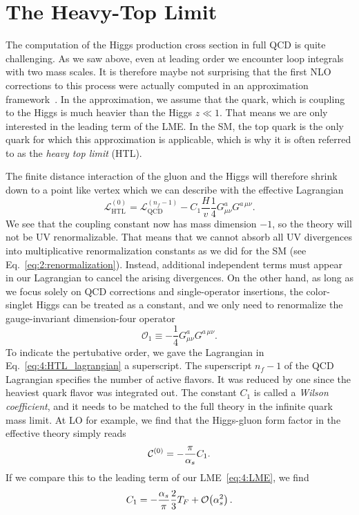 \section{The Heavy-Top Limit} \label{sec:4:HTL}
The computation of the Higgs production cross section in full \acs{QCD} is quite challenging. As we saw above, even at leading order we encounter loop integrals with two mass scales. It is therefore maybe not surprising that the first \acs{NLO} corrections to this process were actually computed in an approximation framework~\cite{Dawson:1990zj}. In the approximation, we assume that the quark, which is coupling to the Higgs is much heavier than the Higgs $z \ll 1$. That means we are only interested in the leading term of the \acs{LME}. In the \acs{SM}, the top quark is the only quark for which this approximation is applicable, which is why it is often referred to as the \textit{heavy top limit} (\acs{HTL}).

The finite distance interaction of the gluon and the Higgs will therefore shrink down to a point like vertex which we can describe with the effective Lagrangian
\begin{equation}
\mathcal{L}_{\text{HTL}}^{(0)} = \mathcal{L}_{\text{QCD}}^{(n_f - 1)} - C_1 \frac{H}{v} \frac{1}{4} G^a_{\mu \nu} G^{a\, \mu\nu}.
\label{eq:4:HTL_lagrangian}
\end{equation}
We see that the coupling constant now has mass dimension $-1$, so the theory will not be \acs{UV} renormalizable. That means that we cannot absorb all \acs{UV} divergences into multiplicative renormalization constants as we did for the \acs{SM} (see Eq.~\eqref{eq:2:renormalization}). Instead, additional independent terms must appear in our Lagrangian to cancel the arising divergences. On the other hand, as long as we focus solely on \acs{QCD} corrections and single-operator insertions, the color-singlet Higgs can be treated as a constant, and we only need to renormalize the gauge-invariant dimension-four operator
\begin{equation}
\mathcal{O}_1 \equiv -\frac{1}{4} G_{\mu\nu}^a G^{a\, \mu\nu}.
\end{equation}
To indicate the pertubative order, we gave the Lagrangian in Eq.~\eqref{eq:4:HTL_lagrangian} a superscript. The superscript $n_f - 1$ of the QCD Lagrangian specifies the number of active flavors. It was reduced by one since the heaviest quark flavor was integrated out. The constant $C_1$ is called a \textit{Wilson coefficient}, and it needs to be matched to the full theory in the infinite quark mass limit. At \acs{LO} for example, we find that the Higgs-gluon form factor in the effective theory simply reads
\begin{equation}
 \mathcal{C}^{(0)} = - \frac{\pi}{\alpha_s}C_1.
\end{equation}
If we compare this to the leading term of our \acs{LME}~\eqref{eq:4:LME}, we find
\begin{equation}
C_1 = -\frac{\alpha_s}{\pi} \frac{2}{3} T_F + \mathcal{O}\!\left(\alpha_s^2\right).
\label{eq:4:C1_Wilson_coefficient_LO}
\end{equation}

